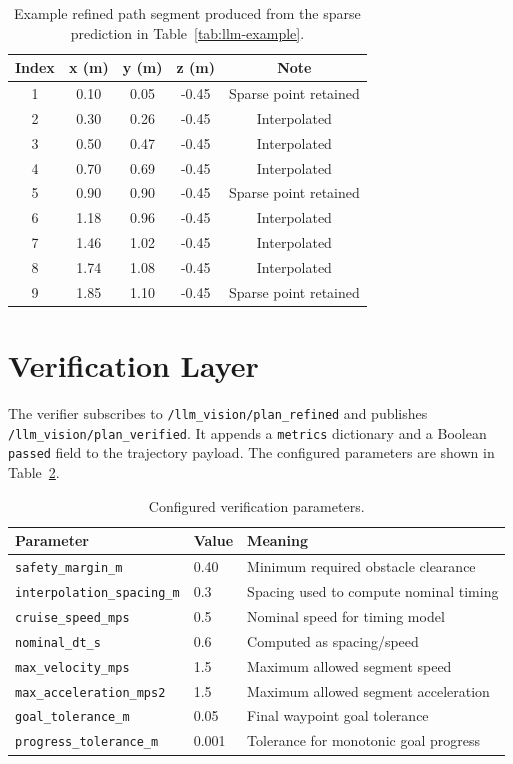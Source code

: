 \documentclass[11pt]{article}
\begin{document}
\begin{table}[H]
\centering
\caption{Example refined path segment produced from the sparse prediction in Table~\ref{tab:llm-example}.}
\label{tab:refined-example}
\begin{tabular}{ccccc}
\toprule
Index & x (m) & y (m) & z (m) & Note \\
\midrule
1 & 0.10 & 0.05 & -0.45 & Sparse point retained \\
2 & 0.30 & 0.26 & -0.45 & Interpolated \\
3 & 0.50 & 0.47 & -0.45 & Interpolated \\
4 & 0.70 & 0.69 & -0.45 & Interpolated \\
5 & 0.90 & 0.90 & -0.45 & Sparse point retained \\
6 & 1.18 & 0.96 & -0.45 & Interpolated \\
7 & 1.46 & 1.02 & -0.45 & Interpolated \\
8 & 1.74 & 1.08 & -0.45 & Interpolated \\
9 & 1.85 & 1.10 & -0.45 & Sparse point retained \\
\bottomrule
\end{tabular}
\end{table}

\section{Verification Layer}

The verifier subscribes to \texttt{/llm\_vision/plan\_refined} and publishes \texttt{/llm\_vision/plan\_verified}. It appends a \texttt{metrics} dictionary and a Boolean \texttt{passed} field to the trajectory payload. The configured parameters are shown in Table~\ref{tab:verification-params}.

\begin{table}[H]
\centering
\caption{Configured verification parameters.}
\label{tab:verification-params}
\begin{tabular}{lll}
\toprule
Parameter & Value & Meaning \\
\midrule
\texttt{safety\_margin\_m} & 0.40 & Minimum required obstacle clearance \\
\texttt{interpolation\_spacing\_m} & 0.3 & Spacing used to compute nominal timing \\
\texttt{cruise\_speed\_mps} & 0.5 & Nominal speed for timing model \\
\texttt{nominal\_dt\_s} & 0.6 & Computed as spacing/speed \\
\texttt{max\_velocity\_mps} & 1.5 & Maximum allowed segment speed \\
\texttt{max\_acceleration\_mps2} & 1.5 & Maximum allowed segment acceleration \\
\texttt{goal\_tolerance\_m} & 0.05 & Final waypoint goal tolerance \\
\texttt{progress\_tolerance\_m} & 0.001 & Tolerance for monotonic goal progress \\
\bottomrule
\end{tabular}
\end{table}
\end{document}

